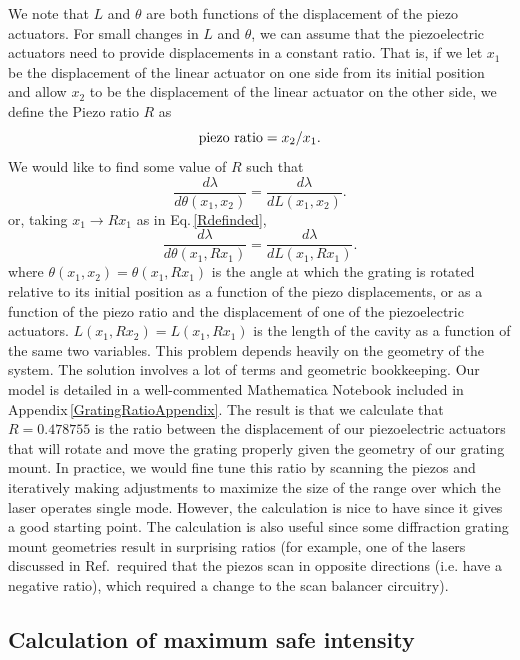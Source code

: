 We note that $L$ and $\theta$ are both functions of the displacement of the piezo actuators. For small changes in $L$ and $\theta$, we can assume that the piezoelectric actuators need to provide displacements in a constant ratio. That is, if we let $x_1$ be the displacement of the linear actuator on one side from its initial position and allow $x_2$ to be the displacement of the linear actuator on the other side, we define the Piezo ratio $R$ as 
\begin{equation}
\label{Rdefinded}
\textnormal{piezo ratio}=x_2/x_1.
\end{equation}
We would like to find some value of $R$ such that
\begin{equation}
    \frac{d\lambda}{d \theta(x_1,x_2)}= \frac{d \lambda}{d L(x_1,x_2)}.
\end{equation}
or, taking $x_1\rightarrow R x_1$ as in Eq.\,\eqref{Rdefinded},
\begin{equation}
    \frac{d\lambda}{d \theta(x_1,R x_1)}= \frac{d \lambda}{d L(x_1,R x_1)}.
\end{equation}
where $\theta(x_1,x_2)=\theta(x_1,R x_1)$ is the angle at which the grating is rotated relative to its initial position as a function of the piezo displacements, or as a function of the piezo ratio and the displacement of one of the piezoelectric actuators. $L(x_1,R x_2)=L(x_1,R x_1)$ is the length of the cavity as a function of the same two variables.
This problem depends heavily on the geometry of the system. The solution involves a lot of terms and geometric bookkeeping. Our model is detailed in a well-commented Mathematica Notebook included in Appendix\,\ref{GratingRatioAppendix}. The result is that we calculate that $R=0.478755$ is the ratio between the displacement of our piezoelectric actuators that will rotate and move the grating properly given the geometry of our grating mount. In practice, we would fine tune this ratio by scanning the piezos and iteratively making adjustments to maximize the size of the range over which the laser operates single mode. However, the calculation is nice to have since it gives a good starting point. The calculation is also useful since some diffraction grating mount geometries result in surprising ratios (for example, one of the lasers discussed in Ref.\,\cite{cjeDiss} required that the piezos scan in opposite directions (i.e. have a negative ratio), which required a change to the scan balancer circuitry).



\subsection{Calculation of maximum safe intensity}

